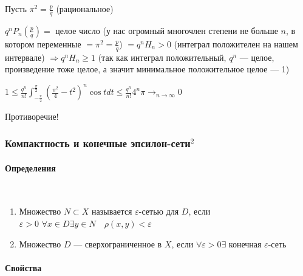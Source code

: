\documentclass{article}
\def\dbl{\,\,}
\let\vanillaparagraph\paragraph
\renewcommand{\paragraph}[1]{\vanillaparagraph{#1}\mbox{}\\}
\begin{document}
Пусть $\pi^2 = \frac{p}{q}$ (рациональное)

$q^{n}P_n(\frac{p}{q}) = $ целое число (у нас огромный многочлен степени не больше $n$, в котором переменные $= \pi^2 = \frac{p}{q}$) $ = q^{n}H_n > 0$ (интеграл положителен на нашем интервале) $\Rightarrow q^{n}H_n \ge 1$ (так как интеграл положительный, $q^n$ --- целое, произведение тоже целое, а значит минимальное положительное целое --- 1)

$1 \le \frac{q^{n}}{n!}\int_{-\frac{\pi}{2}}^{\frac{\pi}{2}}{\left(\frac{\pi^2}{4} - t^2\right)^n\cos t dt} \le \frac{q^{n}}{n!}4^n\pi \rightarrow_{n \rightarrow \infty} 0$

Противоречие!

\subsubsection{Компактность и конечные эпсилон-сети\texorpdfstring{$^2$}{}}

\paragraph{Определения}

\begin{enumerate}
    \item Множество $N \subset X$ называется $\varepsilon$-сетью для $D$, если $\varepsilon > 0 \dbl \forall x \in D \exists y \in N \quad \rho(x, y) < \varepsilon$
    \item Множество $D$ --- сверхограниченное в $X$, если $\forall \varepsilon > 0 \exists$ конечная $\varepsilon$-сеть
\end{enumerate}

\paragraph{Свойства}
\end{document}
